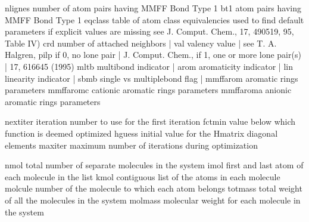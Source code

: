 \documentclass[letterpaper,11pt,english]{sphinxmanual}
\begin{document}
\begin{sphinxVerbatim}[commandchars=\\\{\}]
nlignes         number of atom pairs having MMFF Bond Type 1
bt\PYGZus{}1            atom pairs having MMFF Bond Type 1
eqclass         table of atom class equivalencies used to find
default         parameters if explicit values are missing
see             J. Comput. Chem., 17, 490\PYGZhy{}519, \PYGZsq{}95, Table IV)
crd             number of attached neighbors    |
val             valency value                   |  see T. A. Halgren,
pilp            if 0, no lone pair              |  J. Comput. Chem.,
if              1, one or more lone pair(s)  |  17, 616\PYGZhy{}645 (1995)
mltb            multibond indicator             |
arom            aromaticity indicator           |
lin             linearity indicator             |
sbmb            single\PYGZhy{} vs multiple\PYGZhy{}bond flag   |
mmffarom        aromatic rings parameters
mmffaromc       cationic aromatic rings parameters
mmffaroma       anionic aromatic rings parameters
\end{sphinxVerbatim}

\sphinxAtStartPar
{}

\begin{sphinxVerbatim}[commandchars=\\\{\}]
nextiter        iteration number to use for the first iteration
fctmin          value below which function is deemed optimized
hguess          initial value for the H\PYGZhy{}matrix diagonal elements
maxiter         maximum number of iterations during optimization
\end{sphinxVerbatim}

\sphinxAtStartPar
{}

\begin{sphinxVerbatim}[commandchars=\\\{\}]
nmol            total number of separate molecules in the system
imol            first and last atom of each molecule in the list
kmol            contiguous list of the atoms in each molecule
molcule         number of the molecule to which each atom belongs
totmass         total weight of all the molecules in the system
molmass         molecular weight for each molecule in the system
\end{sphinxVerbatim}

\sphinxAtStartPar
{}
\end{document}
